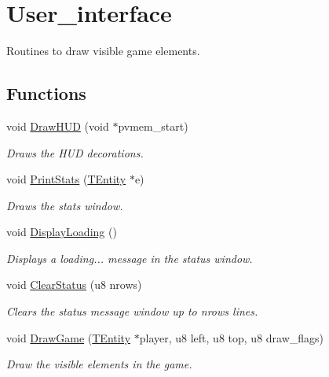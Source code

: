 \hypertarget{group__user__interface}{}\section{User\+\_\+interface}
\label{group__user__interface}


Routines to draw visible game elements.  


\subsection*{Functions}
\begin{DoxyCompactItemize}
\item 
void \mbox{\hyperlink{group__user__interface_ga8922230109f9b08f4aabe8ae3cde95d2}{Draw\+H\+UD}} (void $\ast$pvmem\+\_\+start)
\begin{DoxyCompactList}\small\item\em Draws the H\+UD decorations. \end{DoxyCompactList}\item 
void \mbox{\hyperlink{group__user__interface_ga35b18059a439e2d01de270944eb907ae}{Print\+Stats}} (\mbox{\hyperlink{structTEntity}{T\+Entity}} $\ast$e)
\begin{DoxyCompactList}\small\item\em Draws the {\itshape stats} window. \end{DoxyCompactList}\item 
\mbox{\label{group__user__interface_ga3ada17b0be0c8171d1620e7e32464292}} 
void \mbox{\hyperlink{group__user__interface_ga3ada17b0be0c8171d1620e7e32464292}{Display\+Loading}} ()
\begin{DoxyCompactList}\small\item\em Displays a \textquotesingle{}loading...\textquotesingle{} message in the status window. \end{DoxyCompactList}\item 
\mbox{\label{group__user__interface_ga00fadbe4149660b762278b99dbd7f942}} 
void \mbox{\hyperlink{group__user__interface_ga00fadbe4149660b762278b99dbd7f942}{Clear\+Status}} (u8 nrows)
\begin{DoxyCompactList}\small\item\em Clears the status message window up to {\itshape nrows} lines. \end{DoxyCompactList}\item 
void \mbox{\hyperlink{group__user__interface_gaf665342055aea2d01fc6375b38c8b4df}{Draw\+Game}} (\mbox{\hyperlink{structTEntity}{T\+Entity}} $\ast$player, u8 left, u8 top, u8 draw\+\_\+flags)
\begin{DoxyCompactList}\small\item\em Draw the visible elements in the game. \end{DoxyCompactList}\end{DoxyCompactItemize}
